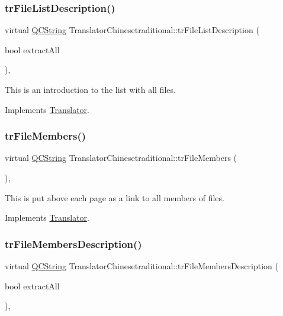 \subsubsection{\texorpdfstring{trFileListDescription()}{trFileListDescription()}}
{\footnotesize\ttfamily virtual \mbox{\hyperlink{class_q_c_string}{Q\+C\+String}} Translator\+Chinesetraditional\+::tr\+File\+List\+Description (\begin{DoxyParamCaption}\item[{bool}]{extract\+All }\end{DoxyParamCaption})\hspace{0.3cm}{\ttfamily [inline]}, {\ttfamily [virtual]}}

This is an introduction to the list with all files. 

Implements \mbox{\hyperlink{class_translator}{Translator}}.

\mbox{\label{class_translator_chinesetraditional_ad0cd759b12e0438aa93db58352555760}} 
\subsubsection{\texorpdfstring{trFileMembers()}{trFileMembers()}}
{\footnotesize\ttfamily virtual \mbox{\hyperlink{class_q_c_string}{Q\+C\+String}} Translator\+Chinesetraditional\+::tr\+File\+Members (\begin{DoxyParamCaption}{ }\end{DoxyParamCaption})\hspace{0.3cm}{\ttfamily [inline]}, {\ttfamily [virtual]}}

This is put above each page as a link to all members of files. 

Implements \mbox{\hyperlink{class_translator}{Translator}}.

\mbox{\label{class_translator_chinesetraditional_a2a6653d648b8d2143da0089c6560fa02}} 
\subsubsection{\texorpdfstring{trFileMembersDescription()}{trFileMembersDescription()}}
{\footnotesize\ttfamily virtual \mbox{\hyperlink{class_q_c_string}{Q\+C\+String}} Translator\+Chinesetraditional\+::tr\+File\+Members\+Description (\begin{DoxyParamCaption}\item[{bool}]{extract\+All }\end{DoxyParamCaption})\hspace{0.3cm}{\ttfamily [inline]}, {\ttfamily [virtual]}}


